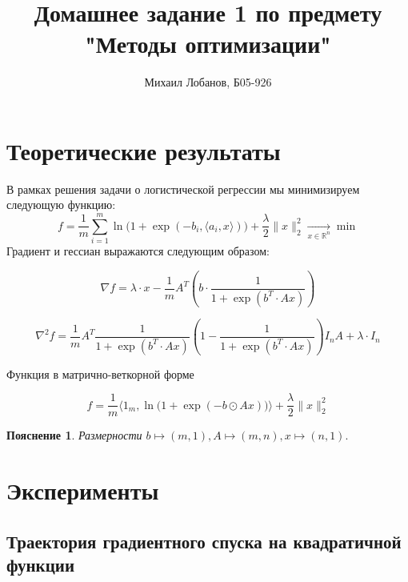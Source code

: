 \documentclass[14pt]{article}
\title{Домашнее задание 1 по предмету "Методы оптимизации"}
\author{ Михаил Лобанов, Б05-926 }
\newtheorem*{details}{Пояснение}
\begin{document}
\maketitle

\section{Теоретические результаты}
В рамках решения задачи о логистической регрессии мы минимизируем следующую функцию:
\begin{equation}
	f = \frac{1}{m}\sum_{i=1}^m\ln \Big(1 + \exp{(-b_i, \langle a_i, x \rangle)}\Big) + \frac{\lambda}{2} \|x\|_2^2 \xrightarrow[x \in \mathbb{R}^n]{} \min
\end{equation}
Градиент и гессиан выражаются следующим образом:

\begin{equation}
	\nabla{f} = \lambda \cdot x - \frac{1}{m} A^T(b \cdot \frac{1}{1 + \exp{(b^T \cdot Ax)}})
\end{equation}

\begin{equation}
	\nabla^2{f} = \frac{1}{m}A^T\frac{1}{1 + \exp{(b^T \cdot Ax)}}(1 - \frac{1}{1 + \exp{(b^T \cdot Ax)}})I_nA + \lambda \cdot \mathit{I}_n
\end{equation}

Функция в матрично-веткорной форме

\begin{equation}
	f = \frac{1}{m} \Bigg\langle 1_m,  \ln \Big(1 + \exp{(-b \odot Ax)}\Big) \Bigg\rangle + \frac{\lambda}{2} \|x\|_2^2
\end{equation}

\begin{details}
	\textrm{Размерности} $ b \mapsto (m, 1), A \mapsto (m, n), x \mapsto (n, 1).$
\end{details}

\section{}
\section{Эксперименты}

\subsection{Траектория градиентного спуска на квадратичной функции}
\end{document}

